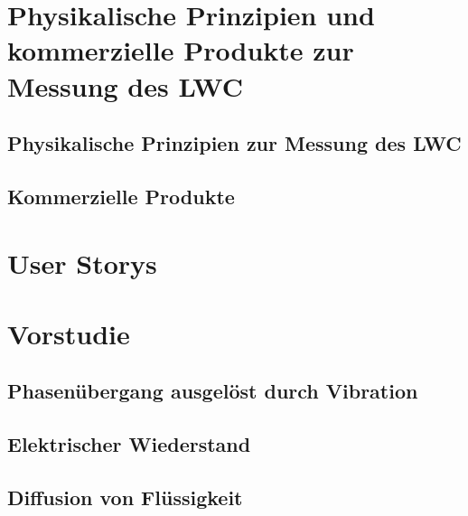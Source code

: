 \documentclass[a4paper,12pt]{article}
\begin{document}
\section{Physikalische Prinzipien und kommerzielle Produkte zur Messung des LWC}




\subsection{Physikalische Prinzipien zur Messung des LWC}


\subsection{Kommerzielle Produkte}


\section{User Storys}



\newpage
\section{Vorstudie}


\subsection{Phasenübergang ausgelöst durch Vibration}


\newpage
\subsection{Elektrischer Wiederstand}


\newpage
\subsection{Diffusion von Flüssigkeit}
\label{sec:TinteVersuchsaufbau}

\end{document}
